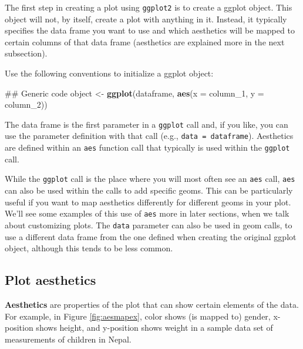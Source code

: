 \documentclass[]{book}
\makeatletter
\newenvironment{Shaded}{\begin{snugshade}}{\end{snugshade}}
\newcommand{\KeywordTok}[1]{\textcolor[rgb]{0.13,0.29,0.53}{\textbf{#1}}}
\newcommand{\DataTypeTok}[1]{\textcolor[rgb]{0.13,0.29,0.53}{#1}}
\newcommand{\DecValTok}[1]{\textcolor[rgb]{0.00,0.00,0.81}{#1}}
\newcommand{\StringTok}[1]{\textcolor[rgb]{0.31,0.60,0.02}{#1}}
\newcommand{\NormalTok}[1]{#1}
\newenvironment{kframe}{%
\medskip{}
\setlength{\fboxsep}{.8em}
 \def\at@end@of@kframe{}%
 \ifinner\ifhmode%
  \def\at@end@of@kframe{\end{minipage}}%
  \begin{minipage}{\columnwidth}%
 \fi\fi%
 \def\FrameCommand##1{\hskip\@totalleftmargin \hskip-\fboxsep
 \colorbox{shadecolor}{##1}\hskip-\fboxsep
     \hskip-\linewidth \hskip-\@totalleftmargin \hskip\columnwidth}%
 \MakeFramed {\advance\hsize-\width
   \@totalleftmargin\z@ \linewidth\hsize
   \@setminipage}}%
 {\par\unskip\endMakeFramed%
 \at@end@of@kframe}
\renewenvironment{Shaded}{\begin{kframe}}{\end{kframe}}
\newenvironment{rmdblock}[1]
  {
  \begin{itemize}
  \renewcommand{\labelitemi}{
    \raisebox{-.7\height}[0pt][0pt]{
      {\setkeys{Gin}{width=3em,keepaspectratio}\texttt{[image: images/\#1]}}
    }
  }
  \setlength{\fboxsep}{1em}
  \begin{kframe}
  \item
  }
  {
  \end{kframe}
  \end{itemize}
  }
\newenvironment{rmdnote}
  {\begin{rmdblock}{note}}
  {\end{rmdblock}}
\theoremstyle{definition}
\theoremstyle{definition}
\theoremstyle{definition}
\theoremstyle{remark}
\makeatother
\begin{document}
The first step in creating a plot using \texttt{ggplot2} is to create a
ggplot object. This object will not, by itself, create a plot with
anything in it. Instead, it typically specifies the data frame you want
to use and which aesthetics will be mapped to certain columns of that
data frame (aesthetics are explained more in the next subsection).

Use the following conventions to initialize a ggplot object:

\begin{Shaded}
\begin{Highlighting}[]
\NormalTok{## Generic code}
\NormalTok{object <-}\StringTok{ }\KeywordTok{ggplot}\NormalTok{(dataframe, }\KeywordTok{aes}\NormalTok{(}\DataTypeTok{x =}\NormalTok{ column_}\DecValTok{1}\NormalTok{, }\DataTypeTok{y =}\NormalTok{ column_}\DecValTok{2}\NormalTok{))}
\end{Highlighting}
\end{Shaded}

The data frame is the first parameter in a \texttt{ggplot} call and, if
you like, you can use the parameter definition with that call (e.g.,
\texttt{data\ =\ dataframe}). Aesthetics are defined within an
\texttt{aes} function call that typically is used within the
\texttt{ggplot} call.

\begin{rmdnote}
While the \texttt{ggplot} call is the place where you will most often
see an \texttt{aes} call, \texttt{aes} can also be used within the calls
to add specific geoms. This can be particularly useful if you want to
map aesthetics differently for different geoms in your plot. We'll see
some examples of this use of \texttt{aes} more in later sections, when
we talk about customizing plots. The \texttt{data} parameter can also be
used in geom calls, to use a different data frame from the one defined
when creating the original ggplot object, although this tends to be less
common.
\end{rmdnote}

\subsection{Plot aesthetics}\label{plot-aesthetics}

\textbf{Aesthetics} are properties of the plot that can show certain
elements of the data. For example, in Figure \ref{fig:aesmapex}, color
shows (is mapped to) gender, x-position shows height, and y-position
shows weight in a sample data set of measurements of children in Nepal.
\end{document}
